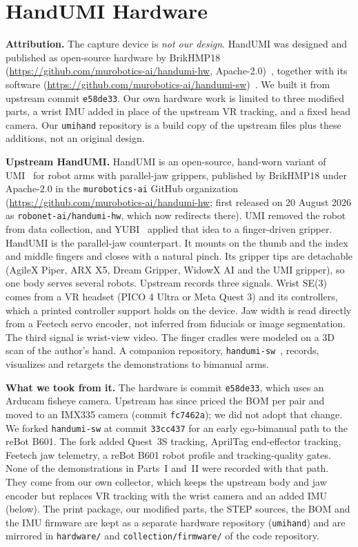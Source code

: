 \documentclass[conference,10pt]{IEEEtran}
\begin{document}
\section{HandUMI Hardware}\label{sec:hw}
\textbf{Attribution.} The capture device is \emph{not our design}. HandUMI was designed and published as open-source hardware
by BrikHMP18 (\url{https://github.com/murobotics-ai/handumi-hw}, Apache-2.0)~\cite{handumi_hw}, together with its software
(\url{https://github.com/murobotics-ai/handumi-sw})~\cite{handumi_sw}. We built it from upstream commit \texttt{e58de33}. Our own
hardware work is limited to three modified parts, a wrist IMU added in place of the upstream VR tracking, and a fixed head
camera. Our \texttt{umihand} repository is a build copy of the upstream files plus these additions, not an original design.

\textbf{Upstream HandUMI.} HandUMI is an open-source, hand-worn variant of UMI~\cite{chi2024umi} for robot arms with
parallel-jaw grippers, published by BrikHMP18 under Apache-2.0 in the \texttt{murobotics-ai} GitHub organization
(\url{https://github.com/murobotics-ai/handumi-hw}; first released on 20 August 2026 as \texttt{robonet-ai/handumi-hw}, which
now redirects there). UMI removed the robot from data collection, and YUBI~\cite{ohkawa2026yubi} applied that idea to a
finger-driven gripper. HandUMI is the parallel-jaw counterpart. It mounts on the thumb and the index and middle fingers and
closes with a natural pinch. Its gripper tips are detachable (AgileX Piper, ARX X5, Dream Gripper, WidowX AI and the UMI
gripper), so one body serves several robots. Upstream records three signals. Wrist SE(3) comes from a VR headset (PICO 4
Ultra or Meta Quest 3) and its controllers, which a printed controller support holds on the device. Jaw width is read
directly from a Feetech servo encoder, not inferred from fiducials or image segmentation. The third signal is wrist-view
video. The finger cradles were modeled on a 3D scan of the author's hand. A companion repository,
\texttt{handumi-sw}~\cite{handumi_sw}, records, visualizes and retargets the demonstrations to bimanual arms.

\textbf{What we took from it.} The hardware is commit \texttt{e58de33}, which uses an Arducam fisheye camera. Upstream has since
priced the BOM per pair and moved to an IMX335 camera (commit \texttt{fc7462a}); we did not adopt that change. We forked
\texttt{handumi-sw} at commit \texttt{33cc437} for an early ego-bimanual path to the reBot B601. The fork added Quest~3S
tracking, AprilTag end-effector tracking, Feetech jaw telemetry, a reBot B601 robot profile and tracking-quality gates.
None of the demonstrations in Parts~I and~II were recorded with that path. They come from our own collector, which keeps
the upstream body and jaw encoder but replaces VR tracking with the wrist camera and an added IMU (below). The print package, our modified parts, the STEP sources, the BOM and the IMU
firmware are kept as a separate hardware repository (\texttt{umihand}) and are mirrored in \texttt{hardware/} and
\texttt{collection/firmware/} of the code repository.
\end{document}
